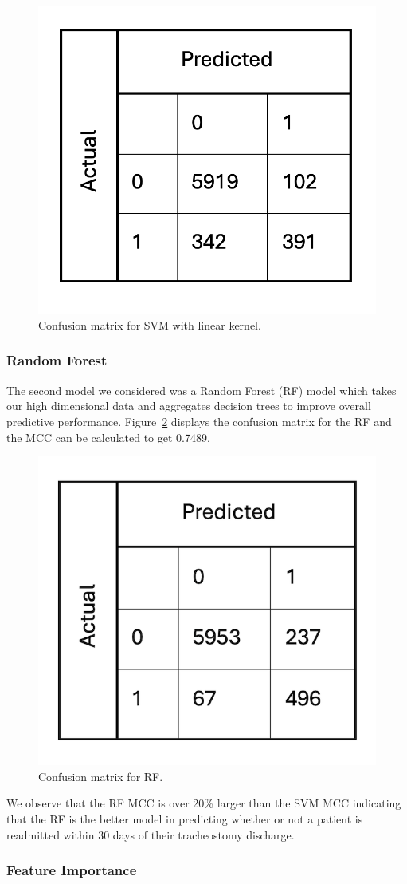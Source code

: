 \documentclass[sn-basic,pdflatex]{sn-jnl}
\theoremstyle{remark}
\theoremstyle{definition}
\begin{document}
\begin{figure}[H]

{\centering \includegraphics[width=0.25\linewidth]{figures/svm_conf} 

}

\caption{Confusion matrix for SVM with linear kernel.}\label{fig:svm_conf}
\end{figure}

\hypertarget{sec4AC}{%
\subsubsection{Random Forest}\label{sec4AC}}

The second model we considered was a Random Forest (RF) model which
takes our high dimensional data and aggregates decision trees to improve
overall predictive performance. Figure~\ref{fig:rf_conf} displays the
confusion matrix for the RF and the MCC can be calculated to get 0.7489.

\begin{figure}[H]

{\centering \includegraphics[width=0.25\linewidth]{figures/rf_conf} 

}

\caption{Confusion matrix for RF.}\label{fig:rf_conf}
\end{figure}

We observe that the RF MCC is over 20\% larger than the SVM MCC
indicating that the RF is the better model in predicting whether or not
a patient is readmitted within 30 days of their tracheostomy discharge.

\hypertarget{sec4ACA}{%
\subsubsection{Feature Importance}\label{sec4ACA}}
\end{document}
